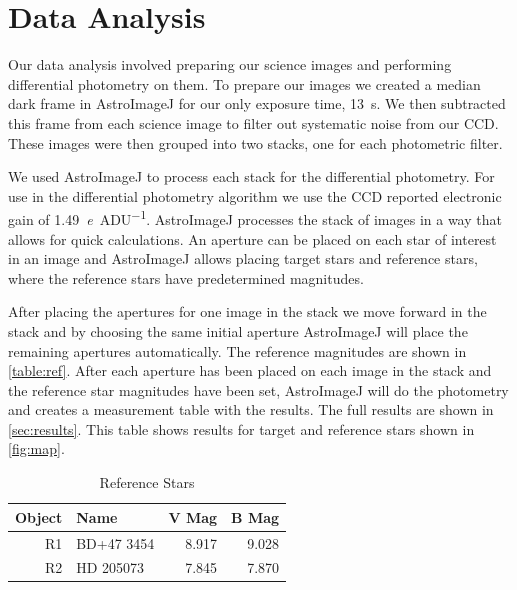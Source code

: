 \documentclass[%
aip,
jmp,
reprint,
floatfix
]{revtex4-1}
\begin{document}
	\section{Data Analysis}
	Our data analysis involved preparing our science images and performing differential photometry on them. To prepare our images we created a median dark frame in AstroImageJ for our only exposure time, \SI{13}{\second}. We then subtracted this frame from each science image to filter out systematic noise from our CCD. These images were then grouped into two stacks, one for each photometric filter.
	
	We used AstroImageJ to process each stack for the differential photometry. For use in the differential photometry algorithm we use the CCD reported electronic gain of \SI{1.49}{\elementarycharge\per{ADU}}. AstroImageJ processes the stack of images in a way that allows for quick calculations. An aperture can be placed on each star of interest in an image and AstroImageJ allows placing target stars and reference stars, where the reference stars have predetermined magnitudes.
	
	After placing the apertures for one image in the stack we move forward in the stack and by choosing the same initial aperture AstroImageJ will place the remaining apertures automatically. The reference magnitudes are shown in \autoref{table:ref}. After each aperture has been placed on each image in the stack and the reference star magnitudes have been set, AstroImageJ will do the photometry and creates a measurement table with the results. The full results are shown in \autoref{sec:results}. This table shows results for target and reference stars shown in \autoref{fig:map}.

	\begin{table}
		\centering
		\caption{Reference Stars}
		\begin{tabular*}{0.7\linewidth}{@{\extracolsep{\fill}}rlrr}
			\hline
			Object & Name       &        V Mag &        B Mag \\ \hline\hline
			    R1 & BD+47 3454 & \SI{8.917}{} & \SI{9.028}{} \\
			    R2 & HD 205073  & \SI{7.845}{} & \SI{7.870}{} \\ \hline
		\end{tabular*}
		\label{table:ref}
	\end{table}


\end{document}
